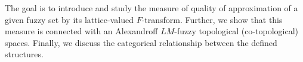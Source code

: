 
		The goal is to introduce and study the measure of quality of approximation of a given fuzzy set by its lattice-valued $F$-transform. Further, we show that this measure is connected with an Alexandroff $LM$-fuzzy topological (co-topological) spaces. Finally, we discuss the categorical relationship between the defined structures.
		
	
